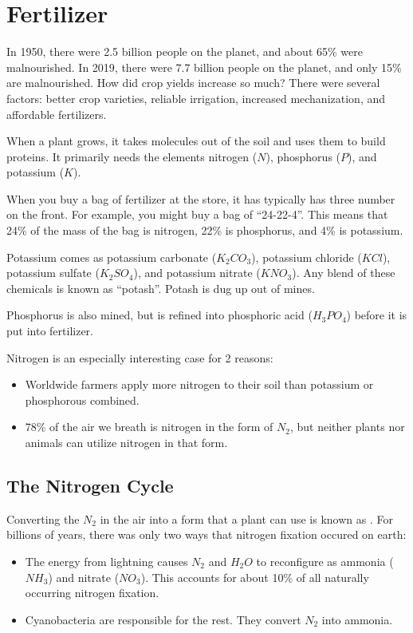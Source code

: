 \chapter{Fertilizer}

In 1950, there were 2.5 billion people on the planet, and about 65\%
were malnourished. In 2019, there were 7.7 billion people on the
planet, and only 15\% are malnourished. How did crop yields increase
so much? There were several factors: better crop varieties,
reliable irrigation, increased mechanization, and affordable fertilizers.

When a plant grows, it takes molecules out of the soil and uses them
to build proteins. It primarily needs the elements nitrogen ($N$),
phosphorus ($P$), and potassium ($K$).  

When you buy a bag of fertilizer at the store, it has typically has
three number on the front.  For example, you might buy a bag of
``24-22-4''.  This means that 24\% of the mass of the bag is nitrogen,
22\% is phosphorus, and 4\% is potassium.

Potassium comes as potassium carbonate ($K_2CO_3$), potassium chloride
($KCl$), potassium sulfate ($K_2 SO_4$), and potassium nitrate
($KNO_3$). Any blend of these chemicals is known as ``potash''. Potash
is dug up out of mines. 

Phosphorus is also mined, but is refined into phosphoric acid
($H_3PO_4$) before it is put into fertilizer.

Nitrogen is an especially interesting case for 2 reasons:
\begin{itemize}
\item Worldwide farmers apply more nitrogen to their soil than potassium or phosphorous combined.
\item 78\% of the air we breath is nitrogen in the form of $N_2$, but
  neither plants nor animals can utilize nitrogen in that form.
\end{itemize}

\section{The Nitrogen Cycle}

Converting the $N_2$ in the air into a form that a plant can use
is known as . For billions of years, there
was only two ways that nitrogen fixation occured on earth:
\begin{itemize}
\item The energy from lightning causes $N_2$ and $H_2O$ to reconfigure as ammonia ($NH_3$) and nitrate ($NO_3$). This accounts for about 10\% of all naturally occurring nitrogen fixation.
\item Cyanobacteria are responsible for the rest. They convert $N_2$ into ammonia.
\end{itemize} 

